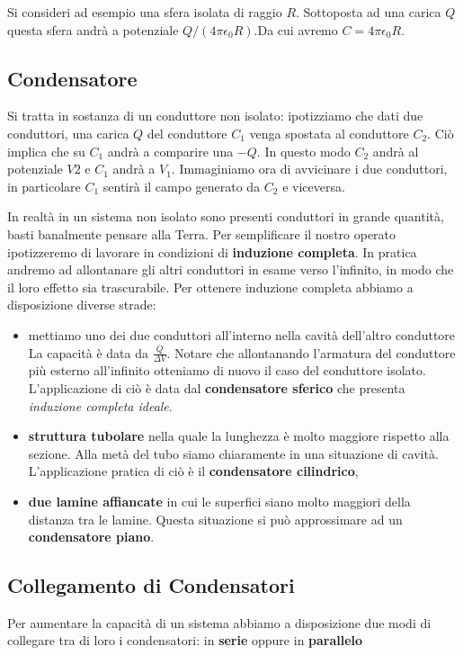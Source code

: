 Si consideri ad esempio una sfera isolata di raggio $R$. Sottoposta ad una carica $Q$ questa sfera andrà a potenziale $Q/(4\pi\epsilon_0 R)$.Da cui avremo $C = 4\pi\epsilon_0R$. 

\subsection{Condensatore}
Si tratta in sostanza di un conduttore non isolato: ipotizziamo che dati due conduttori, una carica $Q$ del conduttore $C_1$ venga spostata al conduttore $C_2$. Ciò implica che su $C_1$ andrà a comparire una $-Q$. In questo modo $C_2$ andrà al potenziale $V2$ e $C_1$ andrà a $V_1$. Immaginiamo ora di avvicinare i due conduttori, in particolare $C_1$ sentirà il campo generato da $C_2$ e viceversa. 

In realtà in un sistema non isolato sono presenti conduttori in grande quantità, basti banalmente pensare alla Terra. Per semplificare il nostro operato ipotizzeremo di lavorare in condizioni di \textbf{induzione completa}. In pratica andremo ad allontanare gli altri conduttori in esame verso l'infinito, in modo che il loro effetto sia trascurabile.  Per ottenere induzione completa abbiamo a disposizione diverse strade:

\begin{itemize}
	\item mettiamo uno dei due conduttori all'interno nella cavità dell'altro conduttore La capacità è data da $\frac{Q}{\Delta V}$. Notare che allontanando l'armatura del conduttore più esterno all'infinito otteniamo di nuovo il caso del conduttore isolato. L'applicazione di ciò è data dal \textbf{condensatore sferico} che presenta \textit{induzione completa ideale}.
	
	\item \textbf{struttura tubolare} nella quale la lunghezza è molto maggiore rispetto alla sezione. Alla metà del tubo siamo chiaramente in una situazione di cavità. L'applicazione pratica di ciò  è il \textbf{condensatore cilindrico},
	
	\item \textbf{due lamine affiancate} in cui le superfici siano molto maggiori della distanza tra le lamine. Questa situazione si può approssimare ad un \textbf{condensatore piano}.
\end{itemize}

\subsection{Collegamento di Condensatori}
Per aumentare la capacità di un sistema abbiamo a disposizione due modi di collegare tra di loro i condensatori: in \textbf{serie} oppure in \textbf{parallelo}

